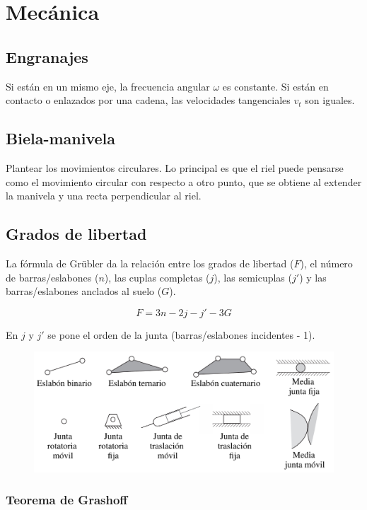\section{Mecánica}

\subsection*{Engranajes}

Si están en un mismo eje, la frecuencia angular $\omega$ es constante. Si están en contacto o enlazados por una cadena, las velocidades tangenciales $v_t$ son iguales.


\subsection*{Biela-manivela}

Plantear los movimientos circulares. Lo principal es que el riel puede pensarse como el movimiento circular con respecto a otro punto, que se obtiene al extender la manivela y una recta perpendicular al riel.


\subsection*{Grados de libertad}

La fórmula de Grübler da la relación entre los grados de libertad ($F$), el número de barras/eslabones ($n$), las cuplas completas ($j$), las semicuplas ($j'$) y las barras/eslabones anclados al suelo ($G$).

$$F = 3n - 2j - j' - 3G$$

En $j$ y $j'$ se pone el orden de la junta (barras/eslabones incidentes - 1).

\begin{figure}[H]
    \centering
    \includegraphics[width=0.7\linewidth]{Images/juntas.png}
\end{figure}

\subsubsection*{Teorema de Grashoff}

